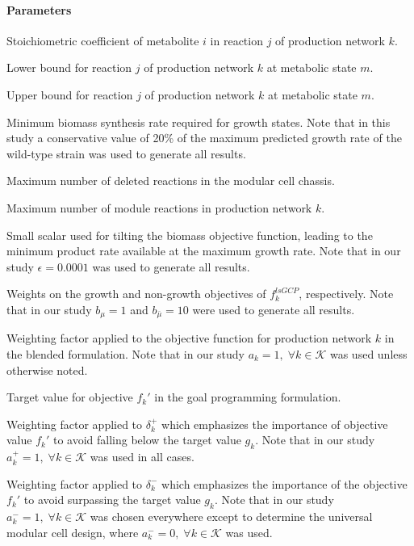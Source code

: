 \paragraph{Parameters}
\begin{description}[leftmargin=1.6cm, style=nextline, itemindent=-10pt]
\item[$S_{ijk}$] Stoichiometric coefficient of metabolite $i$ in reaction $j$ of production network $k$.
\item[$l_{jkm}$] Lower bound for reaction $j$ of production network $k$ at metabolic state $m$.
\item[$u_{jkm}$] Upper bound for reaction $j$ of production network $k$ at metabolic state $m$.
\item[$\gamma$] Minimum biomass synthesis rate required for growth states. Note that in this study a conservative value of 20\% of the maximum predicted growth rate of the wild-type strain was used to generate all results.
\item[$\alpha$] Maximum number of deleted reactions in the modular cell chassis.
\item[$\beta_k$] Maximum number of module reactions in production network $k$.
\item[$\epsilon$] Small scalar used for tilting the biomass objective function, leading to the minimum product rate available at the maximum growth rate. Note that in our study $\epsilon=0.0001$ was used to generate all results.
\item[$b_{\mu}$, $b_{\bar{\mu}}$] Weights on the growth  and non-growth objectives of $f_k^{lsGCP}$, respectively. Note that in our study  $b_{\mu}=1$ and $b_{\bar{\mu}}=10$ were used to generate all results.
\item[$a_k$] Weighting factor applied to the objective function for production network $k$ in the  blended formulation. Note that in our study $a_k =1, \; \forall k \in \mathcal{K}$ was used unless otherwise noted.
\item[$g_k$] Target value for objective $f_k'$ in the goal programming formulation.
\item[$a_k^+$] Weighting factor applied to $\delta_k^+$ which emphasizes the importance of objective value $f_k'$ to avoid falling below the target value $g_k$. Note that in our study $a_k^+ = 1, \; \forall k \in \mathcal{K}$ was used in all cases.
\item[$a_k^-$] Weighting factor applied to $\delta_k^-$ which emphasizes the importance of the objective $f_k'$ to avoid surpassing the target value $g_k$. Note that in our study $a_k^- = 1, \; \forall k \in \mathcal{K}$ was chosen everywhere except to determine the universal modular cell design, where $a_k^- = 0, \; \forall k \in \mathcal{K}$ was used.

\end{description}
